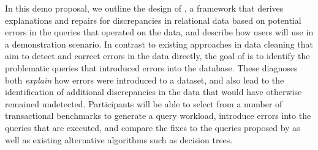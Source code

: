 In this demo proposal, we outline the design of \sys, a framework that derives explanations
and repairs for discrepancies in relational data based on potential errors in
the queries that operated on the data, and describe how users will use \sys
in a demonstration scenario. 
In contrast to existing approaches in data
cleaning that aim to detect and correct errors in the data directly, the goal
of \sys is to identify  the problematic queries that introduced errors into the
database. These diagnoses both \emph{explain} how errors were introduced to a
dataset, and also lead to the identification of additional discrepancies in
the data that would have otherwise remained undetected.
Participants will be able to 
select from a number of transactional benchmarks to generate a query workload,
introduce errors into the queries that are executed,
and compare the fixes to the queries proposed by \sys as well as existing alternative algorithms such as decision trees.



% 






